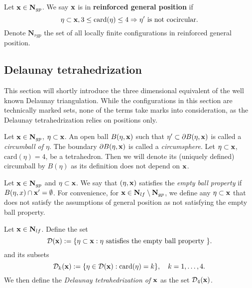 \begin{definition}
Let ${\mathbf{x}} \in \mathbf N_{gp}$. We say ${\mathbf{x}}$ is in \textbf{reinforced general position} if 
$$ \eta \subset {\mathbf{x}}, 3 \leq \mathrm{card}(\eta) \leq 4 \Rightarrow \eta' \text{ is not cocircular.} $$   
Denote $\mathbf N_{rgp}$ the set of all locally finite configurations in reinforced general position.
\end{definition}


\subsection{Delaunay tetrahedrization}
This section will shortly introduce the three dimensional equivalent of the well known Delaunay triangulation. While the configurations in this section are technically marked sets, none of the terms take marks into consideration, as the Delaunay tetrahedrization relies on positions only.

\begin{definition}
	Let ${\mathbf{x}} \in \mathbf N_{gp}$, $\eta \subset {\mathbf{x}}$. An open ball $B(\eta,{\mathbf{x}})$ such that $\eta' \subset \partial B(\eta,{\mathbf{x}})$ is called a \textit{circumball of $\eta$}. The boundary $\partial B(\eta,{\mathbf{x}})$ is called a \textit{circumsphere}.
	Let $\eta\subset{\mathbf{x}}$, $\mathrm{card}(\eta)=4$, be a tetrahedron. Then we will denote its (uniquely defined) circumball by $B(\eta)$ as its definition does not depend on ${\mathbf{x}}$. 
\end{definition}	

\begin{definition}
	Let ${\mathbf{x}} \in \mathbf N_{gp}$ and $\eta \subset {\mathbf{x}}$. We say that $(\eta,{\mathbf{x}})$ satisfies the \textit{empty ball property} if $B(\eta,x) \cap {\mathbf{x}}' = \emptyset$. 
	For convenience, for ${\mathbf{x}} \in \mathbf N_{lf}\setminus \mathbf N_{gp}$, we define any $\eta\subset {\mathbf{x}}$ that does not satisfy the assumptions of general position as not satisfying the empty ball property.
\end{definition}

\begin{definition}
	Let ${\mathbf{x}} \in \mathbf N_{lf}$. Define the set 
	$$\mathcal {D}({\mathbf{x}}) := \{\eta\subset {\mathbf{x}}: \eta \text{ satisfies the empty ball property }\}.$$
	and its subsets
	$$\mathcal {D}_k({\mathbf{x}}) := \{\eta \in \mathcal {D}({\mathbf{x}}): \mathrm{card}(\eta)=k \},\quad k = 1,\dots,4.$$
	We then define the \textit{Delaunay tetrahedrization of ${\mathbf{x}}$} as the set $\mathcal D_4({\mathbf{x}})$. 
\end{definition}

